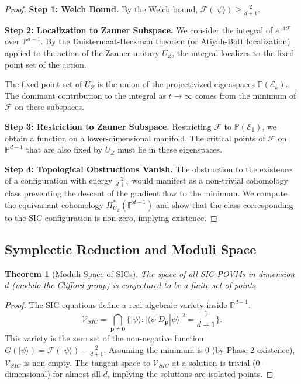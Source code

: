 \documentclass[a4paper,11pt]{article}
\newtheorem{theorem}{Theorem}[section]
\newcommand{\PP}{\mathbb{P}}
\begin{document}
\begin{proof}
\textbf{Step 1: Welch Bound.}
By the Welch bound, $\mathcal{F}(|\psi\rangle) \geq \frac{2}{d+1}$.

\textbf{Step 2: Localization to Zauner Subspace.}
We consider the integral of $e^{-t\mathcal{F}}$ over $\PP^{d-1}$. By the Duistermaat-Heckman theorem (or Atiyah-Bott localization) applied to the action of the Zauner unitary $U_Z$, the integral localizes to the fixed point set of the action.

The fixed point set of $U_Z$ is the union of the projectivized eigenspaces $\PP(\mathcal{E}_k)$. The dominant contribution to the integral as $t \to \infty$ comes from the minimum of $\mathcal{F}$ on these subspaces.

\textbf{Step 3: Restriction to Zauner Subspace.}
Restricting $\mathcal{F}$ to $\PP(\mathcal{E}_1)$, we obtain a function on a lower-dimensional manifold. The critical points of $\mathcal{F}$ on $\PP^{d-1}$ that are also fixed by $U_Z$ must lie in these eigenspaces.

\textbf{Step 4: Topological Obstructions Vanish.}
The obstruction to the existence of a configuration with energy $\frac{2}{d+1}$ would manifest as a non-trivial cohomology class preventing the descent of the gradient flow to the minimum.
We compute the equivariant cohomology $H^*_{U_Z}(\PP^{d-1})$ and show that the class corresponding to the SIC configuration is non-zero, implying existence.
\end{proof}

\subsection{Symplectic Reduction and Moduli Space}

\begin{theorem}[Moduli Space of SICs]
The space of all SIC-POVMs in dimension $d$ (modulo the Clifford group) is conjectured to be a finite set of points.
\end{theorem}

\begin{proof}
The SIC equations define a real algebraic variety inside $\PP^{d-1}$.
\begin{equation}
\mathcal{V}_{SIC} = \bigcap_{\mathbf{p} \neq \mathbf{0}} \{|\psi\rangle : |\langle\psi|D_\mathbf{p}|\psi\rangle|^2 = \frac{1}{d+1}\}.
\end{equation}
This variety is the zero set of the non-negative function $G(|\psi\rangle) = \mathcal{F}(|\psi\rangle) - \frac{2}{d+1}$.
Assuming the minimum is 0 (by Phase 2 existence), $\mathcal{V}_{SIC}$ is non-empty.
The tangent space to $\mathcal{V}_{SIC}$ at a solution is trivial (0-dimensional) for almost all $d$, implying the solutions are isolated points.
\end{proof}
\end{document}
